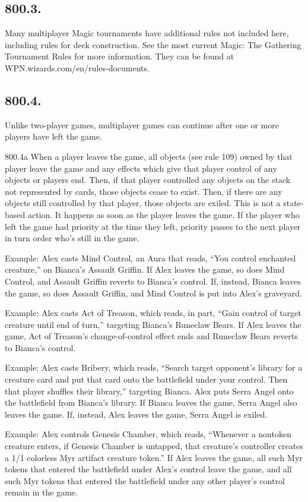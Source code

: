 \subsection*{800.3.}
Many multiplayer Magic tournaments have additional rules not included here, including rules for deck construction. See the most current Magic: The Gathering Tournament Rules for more information. They can be found at WPN.wizards.com/en/rules-documents.

\subsection*{800.4.}
Unlike two-player games, multiplayer games can continue after one or more players have left the game.

800.4a When a player leaves the game, all objects (see rule 109) owned by that player leave the game and any effects which give that player control of any objects or players end. Then, if that player controlled any objects on the stack not represented by cards, those objects cease to exist. Then, if there are any objects still controlled by that player, those objects are exiled. This is not a state-based action. It happens as soon as the player leaves the game. If the player who left the game had priority at the time they left, priority passes to the next player in turn order who’s still in the game.

Example: Alex casts Mind Control, an Aura that reads, “You control enchanted creature,” on Bianca’s Assault Griffin. If Alex leaves the game, so does Mind Control, and Assault Griffin reverts to Bianca’s control. If, instead, Bianca leaves the game, so does Assault Griffin, and Mind Control is put into Alex’s graveyard.

Example: Alex casts Act of Treason, which reads, in part, “Gain control of target creature until end of turn,” targeting Bianca’s Runeclaw Bears. If Alex leaves the game, Act of Treason’s change-of-control effect ends and Runeclaw Bears reverts to Bianca’s control.

Example: Alex casts Bribery, which reads, “Search target opponent’s library for a creature card and put that card onto the battlefield under your control. Then that player shuffles their library,” targeting Bianca. Alex puts Serra Angel onto the battlefield from Bianca’s library. If Bianca leaves the game, Serra Angel also leaves the game. If, instead, Alex leaves the game, Serra Angel is exiled.

Example: Alex controls Genesis Chamber, which reads, “Whenever a nontoken creature enters, if Genesis Chamber is untapped, that creature’s controller creates a 1/1 colorless Myr artifact creature token.” If Alex leaves the game, all such Myr tokens that entered the battlefield under Alex’s control leave the game, and all such Myr tokens that entered the battlefield under any other player’s control remain in the game.

